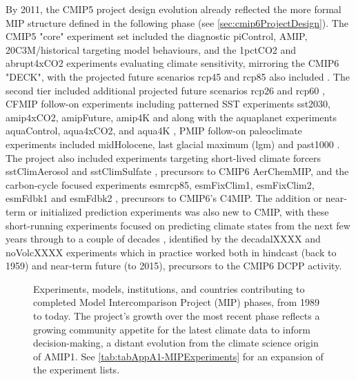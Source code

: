 \documentclass[gmd, preprint]{copernicus}
\newcommand{\mycomment}[1]{}
\begin{document}
By 2011, the CMIP5 project design evolution already reflected the more formal MIP structure defined in the following phase (see \autoref{sec:cmip6ProjectDesign}). The CMIP5 "core" experiment set included the diagnostic piControl, AMIP, 20C3M/historical targeting model behaviours, and the 1pctCO2 and abrupt4xCO2 experiments evaluating climate sensitivity, mirroring the CMIP6 "DECK", with the projected future scenarios rcp45 and rcp85 also included \citep{stouffer_cmip5_2011}. The second tier included additional projected future scenarios rcp26 and rcp60 \citep[precursors to CMIP6 ScenarioMIP experiments;][]{hibbard_primer_2011}, CFMIP follow-on experiments including patterned SST experiments sst2030, amip4xCO2, amipFuture, amip4K and along with the aquaplanet experiments aquaControl, aqua4xCO2, and aqua4K \citep{bony_cfmip_2011}, PMIP follow-on paleoclimate experiments included midHolocene, last glacial maximum (lgm) and past1000 \citep{braconnot_paleoclimate_2011}. The project also included experiments targeting short-lived climate forcers sstClimAerosol and sstClimSulfate \citep{boucher_climate_2011}, precursors to CMIP6 AerChemMIP, and the carbon-cycle focused experiments esmrcp85, esmFixClim1, esmFixClim2, esmFdbk1 and esmFdbk2 \citep{friedlingstein_climate-carbon_2011}, precursors to CMIP6's C4MIP. The addition or near-term or initialized prediction experiments was also new to CMIP, with these short-running experiments focused on predicting climate states from the next few years through to a couple of decades \citep{doblas-reyes_cmip5_2011}, identified by the decadalXXXX and noVolcXXXX experiments which in practice worked both in hindcast (back to 1959) and near-term future (to 2015), precursors to the CMIP6 DCPP activity.

\mycomment{
Map CMIP5 experiments to CMIP6 MIPs
https://github.com/PCMDI/CMIP5_CVs/blob/main/src/writeJson.py
https://docs.google.com/document/d/1bUwK6G_fVZO53UjLZbQUOuBP47PsT8lqKKhL1pjRnKg/edit
}


\begin{figure}
    \centering
    
    \caption{Experiments, models, institutions, and countries contributing to completed Model Intercomparison Project (MIP) phases, from 1989 to today. The project's growth over the most recent phase reflects a growing community appetite for the latest climate data to inform decision-making, a distant evolution from the climate science origin of AMIP1. See \autoref{tab:tabAppA1-MIPExperiments} for an expansion of the experiment lists.}
    \label{fig:fig1-MIPGrowth}
\end{figure}
\end{document}
